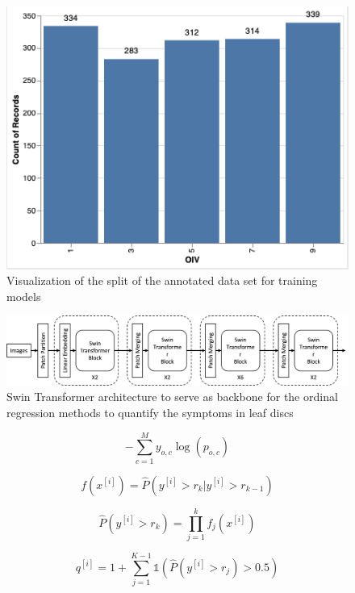 \documentclass[english]{article}
\begin{document}
\begin{figure}[H]
    \begin{center}
        \includegraphics[width=0.7\linewidth]{2023_a_oiv_oiv_distribution}
        \caption{Visualization of the split of the annotated data set for training models}\label{fig:datadistribution}
    \end{center}
\end{figure}

\begin{figure}[H]
    \centering
    \includegraphics[width=0.9\linewidth]{p_viticola/resources/images/swin_transformer.png}
    \caption{Swin Transformer architecture to serve as backbone for the ordinal regression methods to quantify the symptoms in leaf discs}
    \label{fig:enter-label}
\end{figure}

\begin{equation}
    -\sum_{c=1}^My_{o,c}\log(p_{o,c})\label{fml:crossentropy}
\end{equation}

\begin{equation}
    f(x^{[i]}) = \hat{P}(y^{[i]} > r_{k}|y^{[i]} > r_{k-1})\label{fml:binclass}
\end{equation}

\begin{equation}
    \hat{P}(y^{[i]} > r_{k}) = \prod_{j=1}^{k}f_{j}(x^{[i]})\label{fml:unconditionalprob}
\end{equation}

\begin{equation}
    q^{[i]} = 1 + \sum_{j=1}^{K-1}\mathbb{1}(\hat{P}(y^{[i]} > r_{j}) > 0.5)\label{fml:rankprob}
\end{equation}
\end{document}
